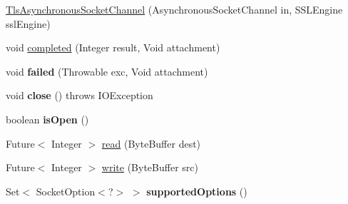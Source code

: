\begin{DoxyCompactItemize}
\item 
\mbox{\hyperlink{classcom_1_1mysql_1_1cj_1_1protocol_1_1_tls_asynchronous_socket_channel_ad896e5429f1178d46c958d0aa078c3cb}{Tls\+Asynchronous\+Socket\+Channel}} (Asynchronous\+Socket\+Channel in, S\+S\+L\+Engine ssl\+Engine)
\item 
void \mbox{\hyperlink{classcom_1_1mysql_1_1cj_1_1protocol_1_1_tls_asynchronous_socket_channel_aa604aa99e8f1a19a3b41b1dffbee6b8f}{completed}} (Integer result, Void attachment)
\item 
\mbox{\label{classcom_1_1mysql_1_1cj_1_1protocol_1_1_tls_asynchronous_socket_channel_a3bf4e0ebbf784acc346d0f1b021c200f}} 
void {\bfseries failed} (Throwable exc, Void attachment)
\item 
\mbox{\label{classcom_1_1mysql_1_1cj_1_1protocol_1_1_tls_asynchronous_socket_channel_aabfaaefdbd511c6d9a50ca1ce463e25e}} 
void {\bfseries close} ()  throws I\+O\+Exception 
\item 
\mbox{\label{classcom_1_1mysql_1_1cj_1_1protocol_1_1_tls_asynchronous_socket_channel_ac928f616d85f2bcdfc1d136b4a5c3a66}} 
boolean {\bfseries is\+Open} ()
\item 
Future$<$ Integer $>$ \mbox{\hyperlink{classcom_1_1mysql_1_1cj_1_1protocol_1_1_tls_asynchronous_socket_channel_a6b74d70823bd434de26eb434a1637b73}{read}} (Byte\+Buffer dest)
\item 
Future$<$ Integer $>$ \mbox{\hyperlink{classcom_1_1mysql_1_1cj_1_1protocol_1_1_tls_asynchronous_socket_channel_a993f4bc3833dc8db73f3163954faca33}{write}} (Byte\+Buffer src)
\item 
\mbox{\label{classcom_1_1mysql_1_1cj_1_1protocol_1_1_tls_asynchronous_socket_channel_ad75f2eb33093dce08214761e80de872d}} 
Set$<$ Socket\+Option$<$?$>$ $>$ {\bfseries supported\+Options} ()
\item 
\mbox{\label{classcom_1_1mysql_1_1cj_1_1protocol_1_1_tls_asynchronous_socket_channel_a0ddea78378a185738bf38b2b44c01b2b}} 

\end{DoxyCompactItemize}
